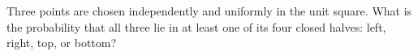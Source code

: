 Three points are chosen independently and uniformly in the unit square. What is the probability that all three lie in at least one of its four closed halves: left, right, top, or bottom?

